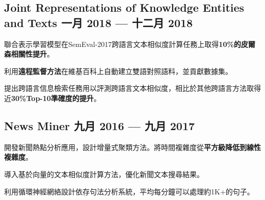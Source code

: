\subsection*{Joint Representations of Knowledge Entities and Texts \hfill 一月 2018 --- 十二月 2018} 
    \begin{zitemize}
        \item 聯合表示學習模型在SemEval-2017跨語言文本相似度計算任務上取得\textbf{10\%的皮爾森相關性提升}。
        \item 利用\textbf{遠程監督方法}在維基百科上自動建立雙語對照語料，並貢獻數據集。
        \item 提出跨語言信息檢索任務用以評測跨語言文本相似度，相比於其他跨語言方法取得近\textbf{30\%Top-10準確度的提升}。
    \end{zitemize}


\subsection*{News Miner \hfill 九月 2016 --- 九月 2017} 
    \begin{zitemize}
        \item 開發新聞熱點分析應用，設計增量式聚類方法。將時間複雜度從\textbf{平方級降低到線性複雜度}。
        \item 導入基於向量的文本相似度計算方法，優化新聞文本搜尋結果。
        \item 利用循環神經網絡設計依存句法分析系統，平均每分鐘可以處理約1K+的句子。
    \end{zitemize}
